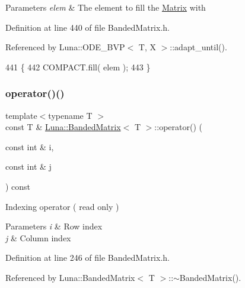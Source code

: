 \begin{DoxyParams}{Parameters}
{\em elem} & The element to fill the \hyperlink{classLuna_1_1Matrix}{Matrix} with \\
\hline
\end{DoxyParams}


Definition at line 440 of file Banded\+Matrix.\+h.



Referenced by Luna\+::\+O\+D\+E\+\_\+\+B\+V\+P$<$ T, X $>$\+::adapt\+\_\+until().


\begin{DoxyCode}
441   \{
442     COMPACT.fill( elem );
443   \}
\end{DoxyCode}
\mbox{\label{classLuna_1_1BandedMatrix_aea48914345ba2db61aa0b8876c69d36e}} 
\subsubsection{\texorpdfstring{operator()()}{operator()()}\hspace{0.1cm}{\footnotesize\ttfamily [1/2]}}
{\footnotesize\ttfamily template$<$typename T $>$ \\
const T \& \hyperlink{classLuna_1_1BandedMatrix}{Luna\+::\+Banded\+Matrix}$<$ T $>$\+::operator() (\begin{DoxyParamCaption}\item[{const int \&}]{i,  }\item[{const int \&}]{j }\end{DoxyParamCaption}) const\hspace{0.3cm}{\ttfamily [inline]}}



Indexing operator ( read only ) 


\begin{DoxyParams}{Parameters}
{\em i} & Row index \\
\hline
{\em j} & Column index \\
\hline
\end{DoxyParams}


Definition at line 246 of file Banded\+Matrix.\+h.



Referenced by Luna\+::\+Banded\+Matrix$<$ T $>$\+::$\sim$\+Banded\+Matrix().


